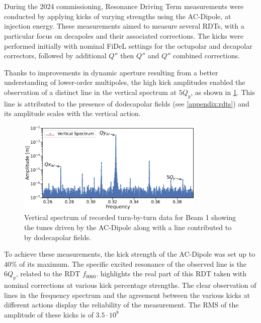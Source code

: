 \section{}


During the 2024 commissioning, Resonance Driving Term measurements were conducted by applying
kicks of varying strengths using the AC-Dipole, at injection energy. These measurements aimed to
measure several RDTs, with a particular focus on decapoles and their associated corrections. The
kicks were performed initially with nominal FiDeL settings for the octupolar and decapolar
correctors, followed by additional $Q''$ then $Q''$ and $Q''$ combined corrections.

Thanks to improvements in dynamic aperture resulting from a better understanding of lower-order
multipoles, the high kick amplitudes enabled the observation of a distinct line in the vertical
spectrum at $5Q_y$, as shown in \cref{fig:high_orders:spectrum_dodecapole_5qy}. This line is
attributed to the presence of dodecapolar fields (see \cref{appendix:rdts}) and its amplitude scales
with the vertical action.

\begin{figure}[!htb]
    \centering
    \includegraphics[width=0.8\textwidth]{./images/spectrum_dodecapole_5qy.pdf}
    \caption{Vertical spectrum of recorded turn-by-turn data for Beam 1 showing the tunes driven by
    the AC-Dipole along with a line contributed to by dodecapolar fields.}
    \label{fig:high_orders:spectrum_dodecapole_5qy}
\end{figure}

To achieve these measurements, the kick strength of the AC-Dipole was set up to $40\%$ of its
maximum. The specific excited resonance of the observed line is the $6Q_y$, related to the RDT
$f_{0060}$.
 highlights the real part of this RDT taken with nominal
corrections at various kick percentage strengths. 
The clear observation of lines in the frequency spectrum and the agreement between the various
kicks at different actions display the reliability of the measurement.
The RMS of the amplitude of these kicks is of $3.5\cdot10^8$

